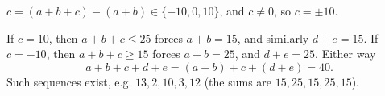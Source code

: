 $c=(a+b+c)-(a+b)\in\{-10,0,10\}$, and $c\neq0$, so $c=\pm10$.

If $c=10$, then $a+b+c\le25$ forces $a+b=15$, and similarly $d+e=15$. If $c=-10$, then $a+b+c\ge15$ forces $a+b=25$, and $d+e=25$. Either way
\[a+b+c+d+e=(a+b)+c+(d+e)=\boxed{40}.\]
Such sequences exist, e.g. $13,2,10,3,12$ (the sums are $15,25,15,25,15$).

